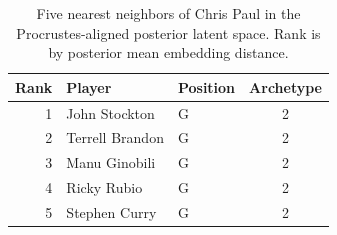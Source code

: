 \begin{table}[htbp]
  \centering\small
  \begin{tabular}{rllc}
    \toprule
    Rank & Player & Position & Archetype \\
    \midrule
    1 & John Stockton & G & 2 \\
    2 & Terrell Brandon & G & 2 \\
    3 & Manu Ginobili & G & 2 \\
    4 & Ricky Rubio & G & 2 \\
    5 & Stephen Curry & G & 2 \\
    \bottomrule
  \end{tabular}
  \caption{Five nearest neighbors of Chris Paul in the Procrustes-aligned posterior latent space. Rank is by posterior mean embedding distance.}
  \label{tab:Chris_Paul_neighbors}
\end{table}

